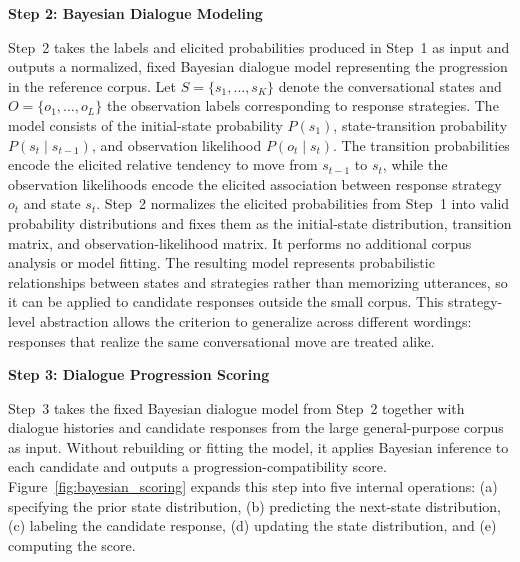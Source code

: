 \documentclass[manuscript,review,anonymous]{acmart}
\begin{document}
\label{mod:bayesian_modeling}
\noindent\textbf{Step 2: Bayesian Dialogue Modeling}\par

Step~2 takes the labels and elicited probabilities produced in Step~1 as input and outputs a normalized, fixed Bayesian dialogue model representing the progression in the reference corpus. Let $S=\{s_1,\ldots,s_K\}$ denote the conversational states and $O=\{o_1,\ldots,o_L\}$ the observation labels corresponding to response strategies.
The model consists of the initial-state probability $P(s_1)$, state-transition probability $P(s_t\mid s_{t-1})$, and observation likelihood $P(o_t\mid s_t)$. The transition probabilities encode the elicited relative tendency to move from $s_{t-1}$ to $s_t$, while the observation likelihoods encode the elicited association between response strategy $o_t$ and state $s_t$.
Step~2 normalizes the elicited probabilities from Step~1 into valid probability distributions and fixes them as the initial-state distribution, transition matrix, and observation-likelihood matrix. It performs no additional corpus analysis or model fitting. The resulting model represents probabilistic relationships between states and strategies rather than memorizing utterances, so it can be applied to candidate responses outside the small corpus. This strategy-level abstraction allows the criterion to generalize across different wordings: responses that realize the same conversational move are treated alike.

\label{mod:scoring}
\noindent\textbf{Step 3: Dialogue Progression Scoring}\par

Step~3 takes the fixed Bayesian dialogue model from Step~2 together with dialogue histories and candidate responses from the large general-purpose corpus as input. Without rebuilding or fitting the model, it applies Bayesian inference to each candidate and outputs a progression-compatibility score. Figure~\ref{fig:bayesian_scoring} expands this step into five internal operations: (a) specifying the prior state distribution, (b) predicting the next-state distribution, (c) labeling the candidate response, (d) updating the state distribution, and (e) computing the score.
\end{document}
